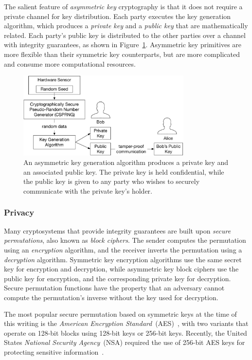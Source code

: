 The salient feature of \textit{asymmetric key} cryptography is that it does not
require a private channel for key distribution. Each party executes the key
generation algorithm, which produces a \textit{private key} and a
\textit{public key} that are mathematically related. Each party's public key
is distributed to the other parties over a channel with integrity guarantees,
as shown in Figure~\ref{fig:asymmetric_key_generation}.
Asymmetric key primitives are more flexible than their symmetric key
counterparts, but are more complicated and consume more computational
resources.

\begin{figure}[hbt]
  \centering
  \includegraphics[width=87mm]{figures/asymmetric_key_generation.pdf}
  \caption{
    An asymmetric key generation algorithm produces a private key and an
    associated public key. The private key is held confidential, while the
    public key is given to any party who wishes to securely communicate with
    the private key's holder.
  }
  \label{fig:asymmetric_key_generation}
\end{figure}


\subsubsection{Privacy}

Many cryptosystems that provide integrity guarantees are built upon
\textit{secure permutations}, also known as \textit{block ciphers}. The sender
computes the permutation using an \textit{encryption} algorithm, and the
receiver inverts the permutation using a \textit{decryption} algorithm.
Symmetric key encryption algorithms use the same secret key for encryption and
decryption, while asymmetric key block ciphers use the public key for
encryption, and the corresponding private key for decryption. Secure
permutation functions have the property that an adversary cannot compute the
permutation's inverse without the key used for decryption.

The most popular secure permutation based on symmetric keys at the time of this
writing is the
\textit{American Encryption Standard}~(AES)~\cite{daemen1999aes, fips2001aes},
with two variants that operate on 128-bit blocks using 128-bit keys or 256-bit
keys. Recently, the United States \textit{National Security Agency}~(NSA)
required the use of 256-bit AES keys for protecting sensitive
information~\cite{nsa2015suiteb}.

